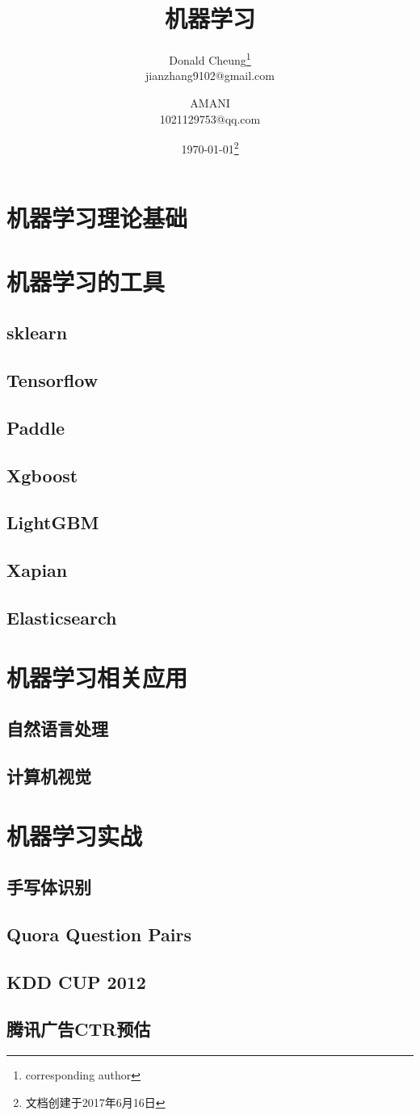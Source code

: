 \documentclass[UTF8,10pt,a4paper]{ctexbook}
\title{机器学习}
\author{Donald Cheung\thanks{corresponding author}\\jianzhang9102@gmail.com \and
        AMANI\\1021129753@qq.com}
\date{\today\footnote{文档创建于2017年6月16日}}
\begin{document}
\tableofcontents

\part{机器学习理论基础}








\part{机器学习的工具}
\chapter{sklearn}
\chapter{Tensorflow}
\chapter{Paddle}
\chapter{Xgboost}
\chapter{LightGBM}
\chapter{Xapian}
\chapter{Elasticsearch}


\part{机器学习相关应用}
\chapter{自然语言处理}
\chapter{计算机视觉}


\part{机器学习实战}
\chapter{手写体识别}
\chapter{Quora Question Pairs}
\chapter{KDD CUP 2012}
\chapter{腾讯广告CTR预估}
\end{document}
